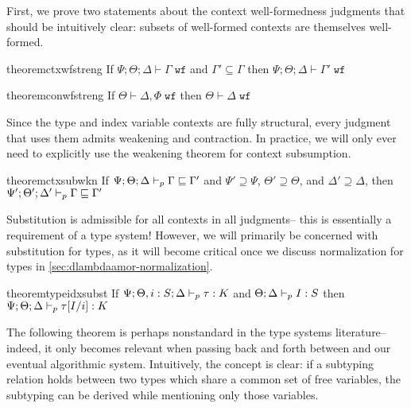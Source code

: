 First, we prove two statements about the context well-formedness judgments that should be intuitively clear: subsets of well-formed contexts are themselves well-formed.

\begin{restatable}[]{theorem}{ctxwfstreng}
If $\Psi ; \Theta ; \Delta \vdash \Gamma \; \texttt{wf}$ and $\Gamma' \subseteq \Gamma$ then $\Psi ; \Theta ; \Delta \vdash \Gamma' \; \texttt{wf}$
\end{restatable}

\begin{restatable}[]{theorem}{conwfstreng}
If $\Theta \vdash \Delta, \Phi \; \texttt{wf}$ then $\Theta \vdash \Delta \; \texttt{wf}$
\end{restatable}

Since the type and index variable contexts are fully structural, every judgment that uses them admits weakening and contraction. In practice, we will only ever need to explicitly use the weakening theorem for context subsumption.

\begin{restatable}[]{theorem}{ctxsubwkn}
\label{thm:ctx-sub-wkn}
If $\Psi ; \Theta ; \Delta \vdash_p \Gamma \sqsubseteq \Gamma'$ and $\Psi' \supseteq \Psi$, $\Theta' \supseteq \Theta$, and $\Delta' \supseteq \Delta$, then
$\Psi' ; \Theta' ; \Delta' \vdash_p \Gamma \sqsubseteq \Gamma'$
\end{restatable}

Substitution is admissible for all contexts in all judgments-- this is essentially a requirement of a type system! However, we will primarily be concerned with substitution for types, as it will become critical once we discuss normalization for types in \autoref{sec:dlambdaamor-normalization}.

\begin{restatable}{theorem}{typeidxsubst}
\label{thm:type-idx-subst}
If $\Psi ; \Theta, i : S ; \Delta \vdash_p \tau : K$ and $\Theta ; \Delta \vdash_p I : S$ then $\Psi ; \Theta ; \Delta \vdash_p \tau[I/i] : K$
\end{restatable}

The following theorem is perhaps nonstandard in the type systems literature-- indeed, it only becomes relevant when passing back and forth between \dlambdaamor and our eventual algorithmic system. Intuitively, the concept is clear: if a subtyping relation holds between two types which share a common set of free variables, the subtyping can be derived while mentioning only those variables.

